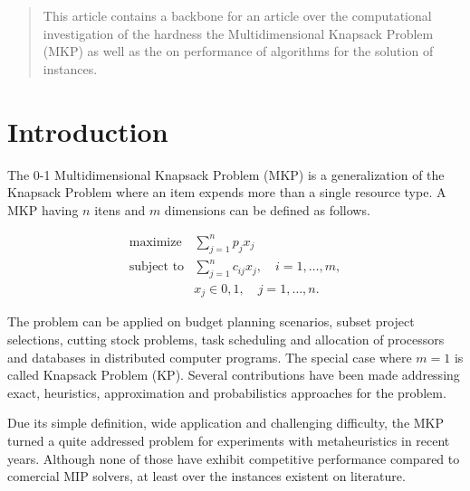 \documentclass{article}
\author{Marcos Daniel Baroni}
\begin{document}
%
%

\begin{abstract}
This article contains a backbone for an article over the computational
investigation of the hardness the Multidimensional Knapsack
Problem (MKP) as well as the on performance of algorithms for the solution of
instances.
\end{abstract}

\section{Introduction}

The 0-1 Multidimensional Knapsack Problem (MKP) is a generalization of the Knapsack
Problem where an item expends more than a single resource type.
A MKP having $n$ itens and $m$ dimensions can be defined as follows.

\begin{align*}
  \text{maximize} & \sum_{j=1}^n p_j x_j \\
  \text{subject to} & \sum_{j=1}^n c_{ij} x_j, \quad i = 1, \ldots, m, \\
   & x_j \in {0, 1}, \quad j = 1, \ldots, n.
\end{align*}

The problem can be applied on budget planning scenarios, subset project
selections, cutting stock problems, task scheduling and allocation of processors
and databases in distributed computer programs.
The special case where $m = 1$ is called Knapsack Problem (KP).
Several contributions have been made addressing exact, heuristics, approximation
and probabilistics approaches for the problem.

Due its simple definition, wide application and challenging
difficulty, the MKP turned a quite addressed problem for experiments
with metaheuristics in recent years.
Although none of those have exhibit competitive performance compared to
comercial MIP solvers, at least over the instances existent on literature.
\end{document}
